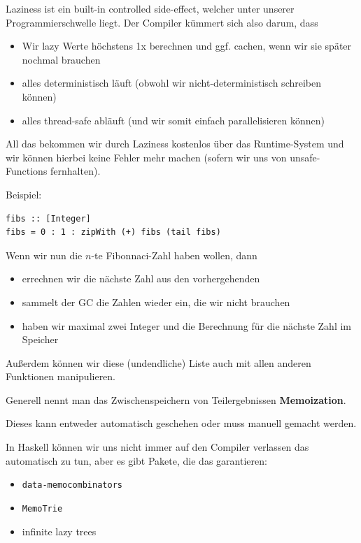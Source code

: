 \documentclass{beamer}
\begin{document}
\begin{frame}
Laziness ist ein \glqq built-in controlled side-effect\grqq , welcher unter unserer Programmierschwelle liegt. Der Compiler kümmert sich also darum, dass\pause
\begin{itemize}
 \item Wir lazy Werte höchstens 1x berechnen und ggf. cachen, wenn wir sie später nochmal brauchen
 \item alles deterministisch läuft (obwohl wir nicht-deterministisch schreiben können)
 \item alles thread-safe abläuft (und wir somit einfach parallelisieren können)
\end{itemize}
\pause
All das bekommen wir durch Laziness kostenlos über das Runtime-System und wir können hierbei keine Fehler mehr machen (sofern wir uns von unsafe-Functions fernhalten).
\end{frame}

\begin{frame}[fragile]
Beispiel:
\begin{verbatim}
fibs :: [Integer]
fibs = 0 : 1 : zipWith (+) fibs (tail fibs)
\end{verbatim}
\pause
\bigskip

Wenn wir nun die $n$-te Fibonnaci-Zahl haben wollen, dann
\begin{itemize}
 \item errechnen wir die nächste Zahl aus den vorhergehenden
 \pause
 \item sammelt der GC die Zahlen wieder ein, die wir nicht brauchen
 \pause
 \item haben wir maximal zwei Integer und die Berechnung für die nächste Zahl im Speicher
\end{itemize}
\pause
Außerdem können wir diese (undendliche) Liste auch mit allen anderen Funktionen manipulieren.
\end{frame}

\begin{frame}[fragile]
Generell nennt man das Zwischenspeichern von Teilergebnissen \textbf{Memoization}.\\\par\pause
Dieses kann entweder automatisch geschehen oder muss manuell gemacht werden.\\\par\pause
In Haskell können wir uns nicht immer auf den Compiler verlassen das automatisch zu tun, aber es gibt Pakete, die das garantieren:
\begin{itemize}
 \item \texttt{data-memocombinators}
 \item \texttt{MemoTrie}
 \item infinite lazy trees
\end{itemize}
\end{frame}
\end{document}
